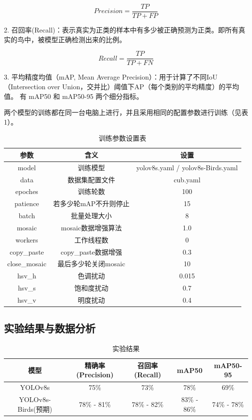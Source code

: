 \documentclass[12pt]{ctexart}
\begin{document}
$$
Precision = \frac{TP}{TP+FP}
$$

2. 召回率(Recall)：表示真实为正类的样本中有多少被正确预测为正类。即所有真实的鸟中，被模型正确检测出来的比例。

$$
Recall = \frac{TP}{TP+FN}
$$

3. 平均精度均值（mAP, Mean Average Precision）：用于计算了不同IoU（Intersection over Union，交并比）阈值下AP（每个类别的平均精度）的平均值。
有 mAP50 和 mAP50-95 两个细分指标。

两个模型的训练都在同一台电脑上进行，并且采用相同的配置参数进行训练（见表1）。

\begin{table}[h!]
  \begin{center}
    \caption{训练参数设置表}
    \begin{tabular}{|c|c|c|} 
      \hline
      参数 & 含义 & 设置 \\
      \hline
      model & 训练模型 & yolov8s.yaml / yolov8s-Birds.yaml \\
      \hline
      data & 数据集配置文件 & cub.yaml  \\
      \hline
      epoches & 训练轮数 & 100 \\
      \hline
      patience & 若多少轮mAP不升则停止 & 15 \\
      \hline
      batch & 批量处理大小 & 8 \\
      \hline
      mosaic & mosaic数据增强算法 & 1.0  \\
      \hline
      workers & 工作线程数 & 0 \\
      \hline
      copy\_paste & copy\_paste数据增强 & 0.3  \\
      \hline
      close\_mosaic & 最后多少轮关闭mosaic & 10 \\
      \hline
      hsv\_h & 色调扰动 & 0.015 \\
      \hline
      hsv\_s & 饱和度扰动 & 0.7 \\
      \hline
      hsv\_v & 明度扰动 & 0.4 \\
      \hline
    \end{tabular}
  \end{center}
\end{table}

\subsection{实验结果与数据分析}

\begin{table}[h!]
  \begin{center}
    \caption{实验结果}
    \begin{tabular}{|c|c|c|c|c|} 
      \hline
      模型 & 精确率(Precision) & 召回率(Recall) & mAP50 & mAP50-95 \\
      \hline
      YOLOv8s & 75\% & 73\% & 78\% & 69\% \\
      \hline
      YOLOv8s-Birds(预期) & 78\% - 81\% & 78\% - 82\% & 83\% - 86\% & 74\% - 78\% \\
      \hline
    \end{tabular}
  \end{center}
\end{table}
\end{document}
